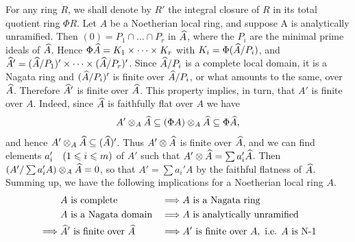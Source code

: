 \documentclass[../main]{subfiles}
\begin{document}
\newparagraph For any ring $R$, we shall denote by $R'$ the integral closure of $R$ in its total quotient ring $\Phi R$. Let $A$ be a Noetherian local ring, and suppose A is analytically unramified. Then $(0)=P_1 \cap \ldots \cap P_r$ in $\widehat{A}$, where the $P_i$ are the minimal prime ideals of $\widehat{A}$. Hence $\Phi\widehat{A}=K_1 \times \dots \times K_r$ with $K_i=\Phi(\widehat{A} / P_i)$, and ${\widehat{A}}'=(\widehat{A} / P_1)' \times \dots \times(\widehat{A} / P_r)'$. Since $\widehat{A} / P_i$ is a complete local domain, it is a Nagata ring and $(\widehat{A} / P_i)'$ is finite over $\widehat{A} / P_i$, or what amounts to the same, over $\widehat{A}$. Therefore ${\widehat{A}}'$ is finite over $\widehat{A}$. This property implies, in turn, that $A'$ is finite over $A$. Indeed, since $\widehat{A}$ is faithfully flat over $A$ we have \[A'\otimes_A \widehat{A}\subseteq (\Phi A)\otimes_A \widehat{A} \subseteq \Phi \widehat{A},\] and hence $A' \otimes_{A} \widehat{A} \subseteq (\widehat{A})'$. Thus $A' \otimes \widehat{A}$ is finite over $\widehat{A}$, and we can find elements $a_i'\for{1 \leqslant i \leqslant m}$ of $A'$ such that $A' \otimes \widehat{A}=\sum a_i' \widehat{A}$. Then $(A' / \sum a_i' A) \otimes_{A} {\widehat{A}}=0$, so that $A'=\sum a_i' A$ by the faithful flatness of $\widehat{A}$. Summing up, we have the following implications for a Noetherian local ring $A$.
\[\begin{aligned}
&A\text{ is complete }&\implies& A\text{ is a Nagata ring}\\
&A\text{ is a Nagata domain} &\implies& A \text{ is analytically unramified}\\\implies& {\widehat{A}}' \text{ is finite over } \widehat{A}&\implies& A' \text{ is finite over }A,\text{ i.e. }A\text{ is N-1}\end{aligned}\]
\end{document}
